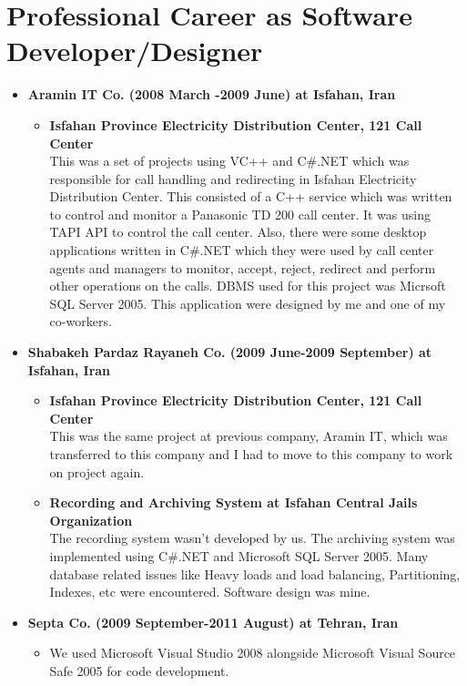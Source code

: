 \documentclass[12pt,a4paper]{article}
\begin{document}
\section{Professional Career as Software Developer/Designer}
	\begin{itemize}
		\item \textbf{Aramin IT Co. (2008 March -2009 June) at Isfahan, Iran}
			\begin{itemize}
				\item \small \textbf{Isfahan Province Electricity Distribution Center, 121 Call Center} \\					
				This was a set of projects using VC++ and C\#.NET which was responsible for call handling and redirecting in Isfahan Electricity Distribution Center. This consisted of a C++ service which was written to control and monitor a Panasonic TD 200 call center. It was using TAPI API to control the call center. Also, there were some desktop applications written in C\#.NET which they were used by call center agents and managers to monitor, accept, reject, redirect and perform other operations on the calls. DBMS used for this project was Micrsoft SQL Server 2005. This application were designed by me and one of my co-workers.
			\end{itemize}
		\item \textbf{Shabakeh Pardaz Rayaneh Co. (2009 June-2009 September) at Isfahan, Iran}
			\begin{itemize}
				\item \small \textbf{Isfahan Province Electricity Distribution Center, 121 Call Center} \\
				This was the same project at previous company, Aramin IT, which was transferred to this company and I had to move to this company to work on project again. \\
				\item \small \textbf{Recording and Archiving System at Isfahan Central Jails Organization} \\
				The recording system wasn't developed by us. The archiving system was implemented using C\#.NET and Microsoft SQL Server 2005. Many database related issues like Heavy loads and load balancing, Partitioning, Indexes, etc were encountered. Software design was mine. 
			\end{itemize}
		\item \textbf{Septa Co. (2009 September-2011 August) at Tehran, Iran}
			\begin{itemize}
				\item We used Microsoft Visual Studio 2008 alongside Microsoft Visual Source Safe 2005 for code development.

\end{itemize}
\end{itemize}
\end{document}
